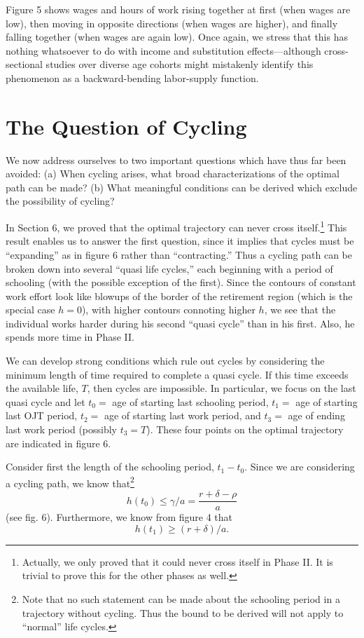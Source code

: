 \documentclass[11pt,fleqn]{article}
\begin{document}
Figure 5 shows wages and hours of work rising together at first (when wages are low), then moving in opposite directions (when wages are higher), and finally falling together (when wages are again low). Once again, we stress that this has nothing whatsoever to do with income and substitution effects---although cross-sectional studies over diverse age cohorts might mistakenly identify this phenomenon as a backward-bending labor-supply function.

\section{The Question of Cycling}

We now address ourselves to two important questions which have thus far been avoided: (a) When cycling arises, what broad characterizations of the optimal path can be made? (b) What meaningful conditions can be derived which exclude the possibility of cycling?

In Section 6, we proved that the optimal trajectory can never cross itself.\footnote{Actually, we only proved that it could never cross itself in Phase II. It is trivial to prove this for the other phases as well.} This result enables us to answer the first question, since it implies that cycles must be ``expanding'' as in figure 6 rather than ``contracting.'' Thus a cycling path can be broken down into several ``quasi life cycles,'' each beginning with a period of schooling (with the possible exception of the first). Since the contours of constant work effort look like blowups of the border of the retirement region (which is the special case $h = 0$), with higher contours connoting higher $h$, we see that the individual works harder during his second ``quasi cycle'' than in his first. Also, he spends more time in Phase II.

We can develop strong conditions which rule out cycles by considering the minimum length of time required to complete a quasi cycle. If this time exceeds the available life, $T$, then cycles are impossible. In particular, we focus on the last quasi cycle and let $t_0 = $ age of starting last schooling period, $t_1 = $ age of starting last OJT period, $t_2 = $ age of starting last work period, and $t_3 = $ age of ending last work period (possibly $t_3 = T$). These four points on the optimal trajectory are indicated in figure 6.

Consider first the length of the schooling period, $t_1 - t_0$. Since we are considering a cycling path, we know that\footnote{Note that no such statement can be made about the schooling period in a trajectory without cycling. Thus the bound to be derived will not apply to ``normal'' life cycles.}
\begin{equation}
h(t_0) \leq \gamma/a = \frac{r + \delta - \rho}{a}
\end{equation}
(see fig. 6). Furthermore, we know from figure 4 that
\begin{equation}
h(t_1) \geq (r + \delta)/a.
\end{equation}
\end{document}
